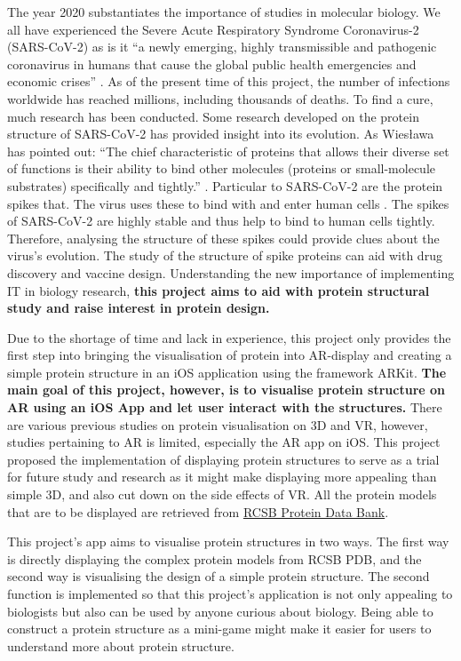 The year 2020 substantiates the importance of studies in molecular biology. We all have experienced the Severe Acute Respiratory Syndrome Coronavirus-2 (SARS-CoV-2) as is it ``a newly emerging, highly transmissible and pathogenic coronavirus in humans that cause the global public health emergencies and economic crises'' \parencite{mittal_covid-19_2020}. As of the present time of this project, the number of infections worldwide has reached millions, including thousands of deaths. To find a cure, much research has been conducted. Some research developed on the protein structure of SARS-CoV-2 has provided insight into its evolution. As Wiesława has pointed out: ``The chief characteristic of proteins that allows their diverse set of functions is their ability to bind other molecules (proteins or small-molecule substrates) specifically and tightly.'' \parencite{hutchison_protein_2013}. Particular to SARS-CoV-2 are the protein spikes that. The virus uses these to bind with and enter human cells \parencite{wrobel_sars-cov-2_2020}. The spikes of SARS-CoV-2 are highly stable and thus help to bind to human cells tightly. Therefore, analysing the structure of these spikes could provide clues about the virus’s evolution. The study of the structure of spike proteins can aid with drug discovery and vaccine design. 
Understanding the new importance of implementing IT in biology research, \textbf{this project aims to aid with protein structural study and raise interest in protein design.}

Due to the shortage of time and lack in experience, this project only provides the first step into bringing the visualisation of protein into AR-display and creating a simple protein structure in an iOS application using the framework ARKit. \textbf{The main goal of this project, however, is to visualise protein structure on AR using an iOS App and let user interact with the structures.} 
There are various previous studies on protein visualisation on 3D and VR, however, studies pertaining to AR is limited, especially the AR app on iOS. This project proposed the implementation of displaying protein structures to serve as a trial for future study and research as it might make displaying more appealing than simple 3D, and also cut down on the side effects of VR. All the protein models that are to be displayed are retrieved from \href{https://www.rcsb.org/}{RCSB Protein Data Bank}. 

This project's app aims to visualise protein structures in two ways. The first way is directly displaying the complex protein models from RCSB PDB, and the second way is visualising the design of a simple protein structure. The second function is implemented so that this project's application is not only appealing to biologists but also can be used by anyone curious about biology. Being able to construct a protein structure as a mini-game might make it easier for users to understand more about protein structure. 

